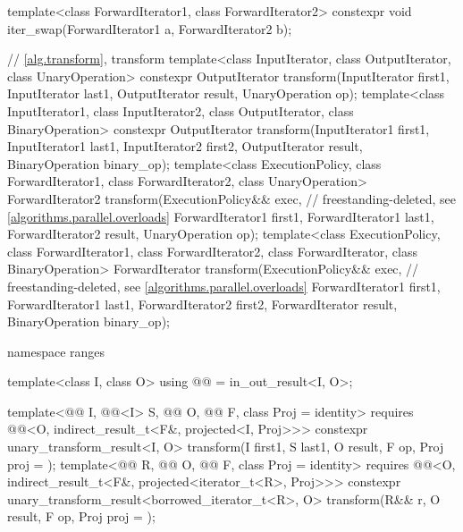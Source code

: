 \begin{codeblock}
{  template<class ForwardIterator1, class ForwardIterator2>
    constexpr void iter_swap(ForwardIterator1 a, ForwardIterator2 b);

  // \ref{alg.transform}, transform
  template<class InputIterator, class OutputIterator, class UnaryOperation>
    constexpr OutputIterator
      transform(InputIterator first1, InputIterator last1,
                OutputIterator result, UnaryOperation op);
  template<class InputIterator1, class InputIterator2, class OutputIterator,
           class BinaryOperation>
    constexpr OutputIterator
      transform(InputIterator1 first1, InputIterator1 last1,
                InputIterator2 first2, OutputIterator result,
                BinaryOperation binary_op);
  template<class ExecutionPolicy, class ForwardIterator1, class ForwardIterator2,
           class UnaryOperation>
    ForwardIterator2
      transform(ExecutionPolicy&& exec,                         // freestanding-deleted, see \ref{algorithms.parallel.overloads}
                ForwardIterator1 first1, ForwardIterator1 last1,
                ForwardIterator2 result, UnaryOperation op);
  template<class ExecutionPolicy, class ForwardIterator1, class ForwardIterator2,
           class ForwardIterator, class BinaryOperation>
    ForwardIterator
      transform(ExecutionPolicy&& exec,                         // freestanding-deleted, see \ref{algorithms.parallel.overloads}
                ForwardIterator1 first1, ForwardIterator1 last1,
                ForwardIterator2 first2, ForwardIterator result,
                BinaryOperation binary_op);

  namespace ranges {
    template<class I, class O>
      using @@ = in_out_result<I, O>;

    template<@@ I, @@<I> S, @@ O,
             @@ F, class Proj = identity>
      requires @@<O, indirect_result_t<F&, projected<I, Proj>>>
      constexpr unary_transform_result<I, O>
        transform(I first1, S last1, O result, F op, Proj proj = {});
    template<@@ R, @@ O, @@ F,
             class Proj = identity>
      requires @@<O, indirect_result_t<F&, projected<iterator_t<R>, Proj>>>
      constexpr unary_transform_result<borrowed_iterator_t<R>, O>
        transform(R&& r, O result, F op, Proj proj = {});

}}
\end{codeblock}
